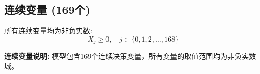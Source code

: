 \documentclass[a4paper,10pt]{article}
\begin{document}
\subsection{连续变量 (169个)}

所有连续变量均为非负实数:
\begin{equation}
X_j \geq 0, \quad j \in \{0, 1, 2, \ldots, 168\}
\end{equation}

\textbf{连续变量说明:} 模型包含169个连续决策变量，所有变量的取值范围均为非负实数域。
\end{document}
